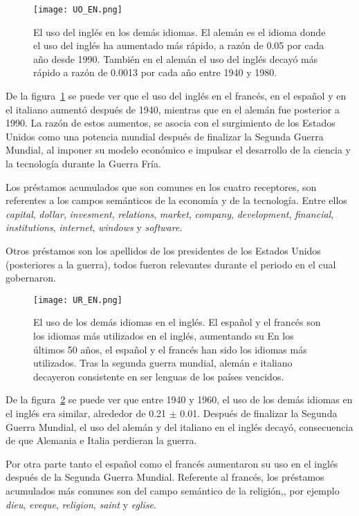\begin{figure}[h!]
	\centering
	\texttt{[image: UO\_EN.png]}
	\caption{El uso del inglés en los demás idiomas. El alemán es el idioma donde el uso del inglés ha aumentado más rápido, a razón de  0.05 por cada año desde 1990. También en el alemán el uso del inglés decayó más rápido a razón de 0.0013 por cada año entre 1940 y 1980.}
	\label{fig.UO_EN}
\end{figure} 


De la figura~\ref{fig.UO_EN} se puede ver que el uso del inglés en el francés, en el español y en el italiano aumentó después de 1940, mientras que en el alemán fue posterior a 1990.  La razón de estos aumentos, se asocia con el surgimiento de los Estados Unidos como una potencia mundial después de finalizar la Segunda Guerra Mundial,  al  imponer  su modelo económico e impulsar el desarrollo de la ciencia y la tecnología durante la Guerra Fría.

Los préstamos acumulados  que son comunes en los cuatro receptores, son referentes a los campos semánticos de la economía y de la tecnología. Entre ellos \textit{capital}, \textit{dollar}, \textit{invesment}, \textit{relations}, \textit{market}, \textit{company}, \textit{development}, \textit{financial},  \textit{institutions}, \textit{internet}, \textit{windows} y \textit{software}. 

Otros préstamos son los apellidos de los presidentes de los Estados Unidos (posteriores a la guerra), todos fueron relevantes durante el periodo en el cual gobernaron. 


\begin{figure}[h!]
	\centering
	\texttt{[image: UR\_EN.png]}
	\caption{El uso de los demás idiomas en el inglés. El español y el francés son los idiomas más utilizados en el inglés, aumentando su 
	En los últimos 50 años, el español y el francés han sido los idiomas más utilizados. Tras la segunda guerra mundial, alemán e italiano decayeron consistente en ser lenguas de los países vencidos.}
	\label{fig.UR_EN}
\end{figure} 


De la figura~\ref{fig.UR_EN} se puede ver que entre 1940 y 1960, el uso de los demás idiomas en el inglés era similar, alrededor de 0.21 $\pm$ 0.01. Después de finalizar la Segunda Guerra Mundial, el uso del alemán y del italiano en el inglés decayó,  consecuencia de que Alemania e Italia perdieran la guerra.

Por otra parte tanto el español como el francés aumentaron su uso en el inglés después de la Segunda Guerra Mundial. Referente al francés, los préstamos acumulados más comunes son del campo semántico de la religión,, por ejemplo \textit{dieu}, \textit{eveque}, \textit{religion}, \textit{saint} y \textit{eglise}.

